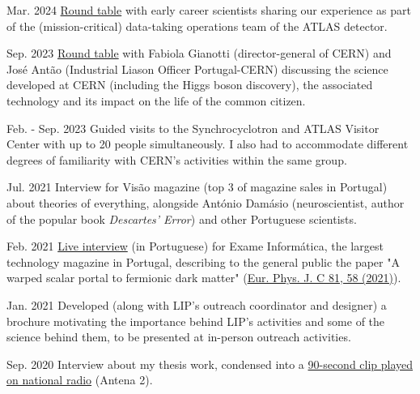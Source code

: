 
\begin{cventries}
    
    {}{Mar. 2024}
    {\href{https://indico.cern.ch/event/1378416/overview}{Round table} with early career scientists sharing our experience as part of the (mission-critical) data-taking operations team of the ATLAS detector.}

    {}{Sep. 2023}
    {\href{https://www.cienciaviva.pt/divulgacao-cientifica/o-bosao-de-higgs-e-as-nossas-vidas}{Round table} with Fabiola Gianotti (director-general of CERN) and José Antão (Industrial Liason Officer Portugal-CERN) discussing the science developed at CERN (including the Higgs boson discovery), the associated technology and its impact on the life of the common citizen.}

    {}{Feb. - Sep. 2023}
    {Guided visits to the Synchrocyclotron and ATLAS Visitor Center with up to 20 people simultaneously. I also had to accommodate different degrees of familiarity with CERN's activities within the same group.}

    {}{Jul. 2021}
    {Interview for Visão magazine (top 3 of magazine sales in Portugal) about theories of everything, alongside António Damásio (neuroscientist, author of the popular book \textit{Descartes' Error}) and other Portuguese scientists.}

    {}{Feb. 2021}
    {\href{https://visao.pt/exameinformatica/videos-ei/eilive/2021-02-08-cromo-da-semana-novas-particulas-atomicas-e-a-quinta-dimensao/}{Live interview} (in Portuguese) for Exame Informática, the largest technology magazine in Portugal, describing to the general public the paper "A warped scalar portal to fermionic dark matter" (\href{https://doi.org/10.1140/epjc/s10052-021-08851-0}{Eur. Phys. J. C 81, 58 (2021)}). }

    {}{Jan. 2021}
    {Developed (along with LIP's outreach coordinator and designer) a brochure motivating the importance behind LIP's activities and some of the science behind them, to be presented at in-person outreach activities.}

    {}{Sep. 2020}
    {Interview about my thesis work, condensed into a \href{https://www.rtp.pt/play/p2936/e491211/90-segundos-ciencia}{90-second clip played on national radio} (Antena 2).}

\end{cventries}


